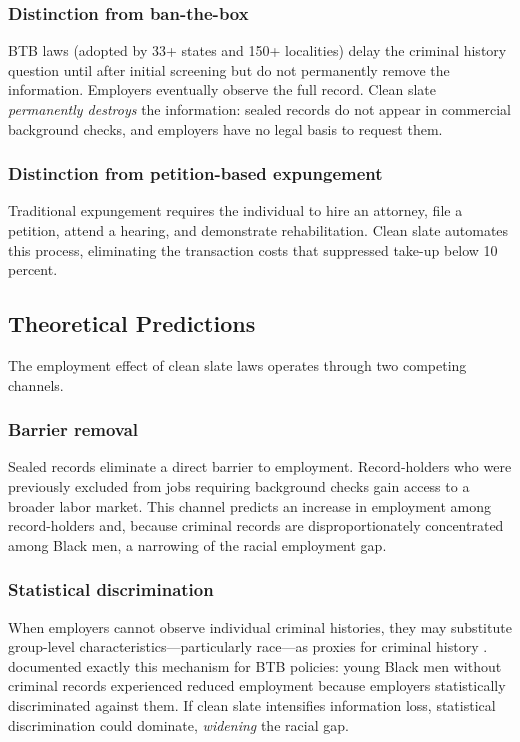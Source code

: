 \documentclass[12pt]{article}
\begin{document}
\subsubsection*{Distinction from ban-the-box} BTB laws (adopted by 33+ states and 150+ localities) delay the criminal history question until after initial screening but do not permanently remove the information. Employers eventually observe the full record. Clean slate \emph{permanently destroys} the information: sealed records do not appear in commercial background checks, and employers have no legal basis to request them.

\subsubsection*{Distinction from petition-based expungement} Traditional expungement requires the individual to hire an attorney, file a petition, attend a hearing, and demonstrate rehabilitation. Clean slate automates this process, eliminating the transaction costs that suppressed take-up below 10 percent.

\subsection{Theoretical Predictions}

The employment effect of clean slate laws operates through two competing channels.

\subsubsection*{Barrier removal} Sealed records eliminate a direct barrier to employment. Record-holders who were previously excluded from jobs requiring background checks gain access to a broader labor market. This channel predicts an increase in employment among record-holders and, because criminal records are disproportionately concentrated among Black men, a narrowing of the racial employment gap.

\subsubsection*{Statistical discrimination} When employers cannot observe individual criminal histories, they may substitute group-level characteristics---particularly race---as proxies for criminal history \citep{arrow1973,phelps1972}. \citet{doleac2020} documented exactly this mechanism for BTB policies: young Black men without criminal records experienced reduced employment because employers statistically discriminated against them. If clean slate intensifies information loss, statistical discrimination could dominate, \emph{widening} the racial gap.
\end{document}
